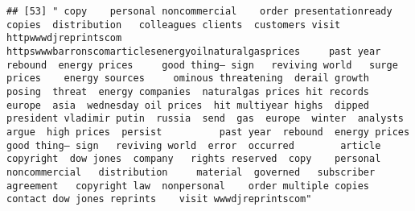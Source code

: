 \documentclass[
]{article}
\begin{document}
\begin{verbatim}
## [53] " copy    personal noncommercial    order presentationready copies  distribution   colleagues clients  customers visit httpwwwdjreprintscom httpswwwbarronscomarticlesenergyoilnaturalgasprices     past year  rebound  energy prices     good thing— sign   reviving world   surge  prices    energy sources     ominous threatening  derail growth   posing  threat  energy companies  naturalgas prices hit records  europe  asia  wednesday oil prices  hit multiyear highs  dipped  president vladimir putin  russia  send  gas  europe  winter  analysts argue  high prices  persist          past year  rebound  energy prices     good thing— sign   reviving world  error  occurred        article      copyright  dow jones  company   rights reserved  copy    personal noncommercial   distribution     material  governed   subscriber agreement   copyright law  nonpersonal    order multiple copies  contact dow jones reprints    visit wwwdjreprintscom"                                                                                                                                                                                                                                                                                                                                                                                                                                                                                                                                                                                                                                                                                                                                                                                                                                                                                                                                                                                                                                                                                                                                                                                                                                                                                                                                                                                                                                                                                                                                                                                                                                                                                                                                                                                                                                                                                                                                                                                                                                                                                                                                                                                                                                                                                                                                                                                                                                                                     
\end{verbatim}
\end{document}
